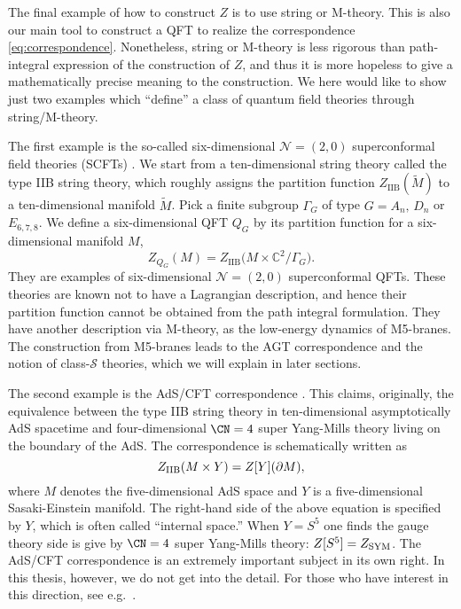 The final example of how to construct $Z$ is to use string or M-theory. This
is also our main tool to construct a QFT to realize the correspondence
\eqref{eq:correspondence}. Nonetheless, string or M-theory
is less rigorous than path-integral expression of the construction
of $Z$, and thus it is more hopeless to give a mathematically precise
meaning to the construction. We here would like to show just two examples
which ``define'' a class of quantum field theories through string/M-theory.


The first example is the so-called six-dimensional $\mathcal{N}=(2,0)$
superconformal field theories (SCFTs) \cite{Witten:1995zh,Strominger:1995ac,Witten:1995em}.
We start from a ten-dimensional string theory called the
type IIB string theory, which roughly assigns the partition
function $Z_{\mathrm{IIB}}(\tilde{M})$ to a ten-dimensional
manifold $\tilde{M}$. Pick a finite subgroup $\Gamma_{G}$
of type $G=A_{n},\,D_{n}$ or $E_{6,7,8}$. We define a six-dimensional
QFT $Q_{G}$ by its partition function for a six-dimensional manifold
$M$,
\begin{equation}
Z_{Q_{G}}(M)  =  Z_{\mathrm{IIB}}\big(M\times\mathbb{C}^{2}/\Gamma_{G}\big).
\end{equation}
They are examples of six-dimensional $\mathcal{N}=(2,0)$
superconformal QFTs. These theories are known not to have a Lagrangian
description, and hence their partition function cannot be obtained from
the path integral formulation. They have another description via M-theory,
as the low-energy dynamics of M5-branes. The construction from M5-branes
leads to the AGT correspondence and the notion of class-$\mathcal{S}$
theories, which we will explain in later sections.


The second example is the AdS/CFT correspondence \cite{Maldacena:1997re,Gubser:1998bc,Witten:1998qj}.
This claims, originally, the equivalence between the type IIB string theory in ten-dimensional asymptotically
AdS spacetime and four-dimensional $\CN=4$ super Yang-Mills theory living on the boundary of the AdS.
The correspondence is schematically written as
\begin{equation}
  Z_{{\rm IIB}}(M\times Y) = Z[Y](\partial M),
\end{equation}
where $M$ denotes the five-dimensional AdS space and $Y$ is a five-dimensional Sasaki-Einstein manifold.
The right-hand side of the above equation is specified by $Y$, which is often called ``internal space.''
When $Y=S^5$ one finds the gauge theory side is give by $\CN=4$ super Yang-Mills theory:
$Z[S^5]=Z_{\rm SYM}$.
The AdS/CFT correspondence is an extremely important subject in its own right.
In this thesis, however, we do not get into the detail. For those who have interest in this direction,
see e.g.~\cite{Aharony:1999ti}.








